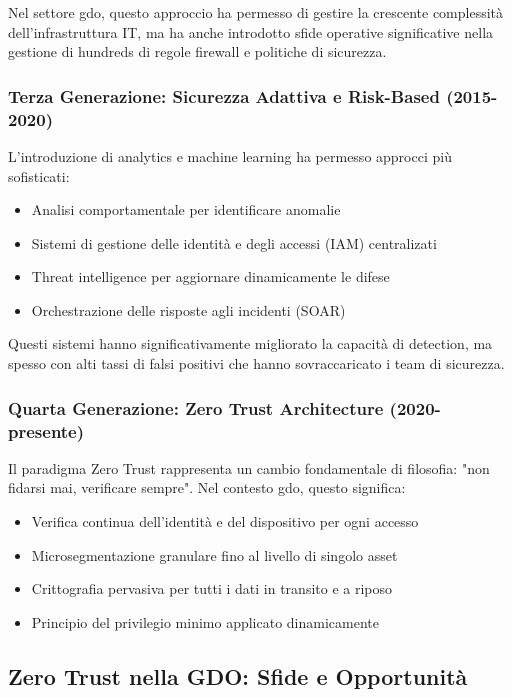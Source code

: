 Nel settore \gls{gdo}, questo approccio ha permesso di gestire la crescente complessità dell'infrastruttura IT, ma ha anche introdotto sfide operative significative nella gestione di hundreds di regole firewall e politiche di sicurezza.

\subsubsection{Terza Generazione: Sicurezza Adattiva e Risk-Based (2015-2020)}

L'introduzione di analytics e machine learning ha permesso approcci più sofisticati:

\begin{itemize}
\item Analisi comportamentale per identificare anomalie
\item Sistemi di gestione delle identità e degli accessi (IAM) centralizati
\item Threat intelligence per aggiornare dinamicamente le difese
\item Orchestrazione delle risposte agli incidenti (SOAR)
\end{itemize}

Questi sistemi hanno significativamente migliorato la capacità di detection, ma spesso con alti tassi di falsi positivi che hanno sovraccaricato i team di sicurezza.

\subsubsection{Quarta Generazione: Zero Trust Architecture (2020-presente)}

Il paradigma Zero Trust rappresenta un cambio fondamentale di filosofia: "non fidarsi mai, verificare sempre". Nel contesto \gls{gdo}, questo significa:

\begin{itemize}
\item Verifica continua dell'identità e del dispositivo per ogni accesso
\item Microsegmentazione granulare fino al livello di singolo asset
\item Crittografia pervasiva per tutti i dati in transito e a riposo
\item Principio del privilegio minimo applicato dinamicamente
\end{itemize}

\subsection{\texorpdfstring{Zero Trust nella GDO: Sfide e Opportunità}{2.4.2 - Zero Trust nella GDO: Sfide e Opportunità}}
\label{subsec:2.4.2_zerotrust_gdo}

